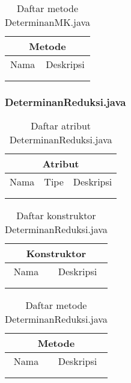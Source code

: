 \begin{table}[H]
    \centering
    \begin{tabular}{c|c}
        \hline
        \hline
        \multicolumn{2}{c}{\textbf{Metode}}\\
        \hline
        \hline
         Nama  & Deskripsi \\
         \hline 
         \hline 
         &  \\
         &  \\
    \end{tabular}
    \caption{Daftar metode DeterminanMK.java}
\end{table}

\subsubsection{DeterminanReduksi.java}

\begin{table}[H]
    \centering
    \begin{tabular}{c|c|c}
        \hline
        \hline
        \multicolumn{3}{c}{\textbf{Atribut}}\\
        \hline
        \hline
         Nama & Tipe & Deskripsi \\
         \hline 
         \hline 
         &  & \\
         &  & \\
    \end{tabular}
    \caption{Daftar atribut DeterminanReduksi.java}
\end{table}

\begin{table}[H]
    \centering
    \begin{tabular}{c|c}
        \hline
        \hline
        \multicolumn{2}{c}{\textbf{Konstruktor}}\\
        \hline
        \hline
         Nama  & Deskripsi \\
         \hline 
         \hline 
         &  \\
         &  \\
    \end{tabular}
    \caption{Daftar konstruktor DeterminanReduksi.java}
\end{table}

\begin{table}[H]
    \centering
    \begin{tabular}{c|c}
        \hline
        \hline
        \multicolumn{2}{c}{\textbf{Metode}}\\
        \hline
        \hline
         Nama  & Deskripsi \\
         \hline 
         \hline 
         &  \\
         &  \\
    \end{tabular}
    \caption{Daftar metode DeterminanReduksi.java}
\end{table}

